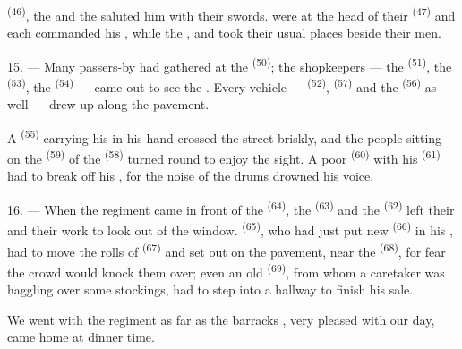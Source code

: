  \textsuperscript{(46)}, the  and the
 saluted him with their swords.
 were at the head of their 
\textsuperscript{(47)} and each  commanded his , while
the ,  and
 took their usual places beside their
men.

15. --- Many passers-by had gathered at the 
\textsuperscript{(50)}; the shopkeepers --- the  \textsuperscript{(51)},
the  \textsuperscript{(53)}, the  \textsuperscript{(54)} --- came out
to see the . Every vehicle ---  \textsuperscript{(52)},
 \textsuperscript{(57)} and the 
\textsuperscript{(56)} as well --- drew up along the pavement.

\VUsaut{3.0mm}

A  \textsuperscript{(55)} carrying his
 in his hand crossed the street briskly, and the people
sitting on the  \textsuperscript{(59)} of the 
\textsuperscript{(58)} turned round to enjoy the sight. A poor
 \textsuperscript{(60)} with his  \textsuperscript{(61)}
had to break off his , for the noise of the drums drowned his
voice.

16. --- When the regiment came in front of the 
\textsuperscript{(64)}, the  \textsuperscript{(63)} and the
 \textsuperscript{(62)} left their  and their
work to look out of the window.  \textsuperscript{(65)}, who had
just put new  \textsuperscript{(66)} in his , had to
move the rolls of  \textsuperscript{(67)} and  set out on the
pavement, near the  \textsuperscript{(68)}, for fear the crowd
would knock them over; even an old  \textsuperscript{(69)}, from whom a
caretaker was haggling over some stockings, had to step into a hallway to
finish his sale.

We went with the regiment as far as the barracks , very pleased
with our day, came home at dinner time.

